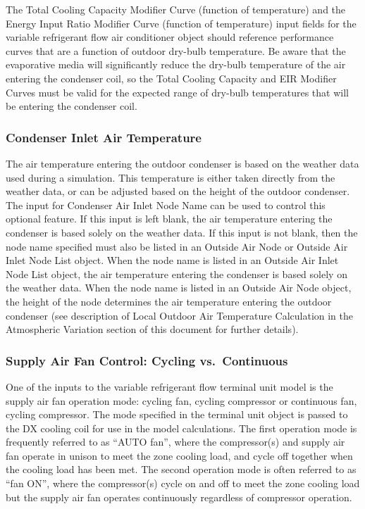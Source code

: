 The Total Cooling Capacity Modifier Curve (function of temperature) and the Energy Input Ratio Modifier Curve (function of temperature) input fields for the variable refrigerant flow air conditioner object should reference performance curves that are a function of outdoor dry-bulb temperature. Be aware that the evaporative media will significantly reduce the dry-bulb temperature of the air entering the condenser coil, so the Total Cooling Capacity and EIR Modifier Curves must be valid for the expected range of dry-bulb temperatures that will be entering the condenser coil.

\subsubsection{Condenser Inlet Air Temperature}\label{condenser-inlet-air-temperature-2}

The air temperature entering the outdoor condenser is based on the weather data used during a simulation. This temperature is either taken directly from the weather data, or can be adjusted based on the height of the outdoor condenser. The input for Condenser Air Inlet Node Name can be used to control this optional feature. If this input is left blank, the air temperature entering the condenser is based solely on the weather data. If this input is not blank, then the node name specified must also be listed in an Outside Air Node or Outside Air Inlet Node List object. When the node name is listed in an Outside Air Inlet Node List object, the air temperature entering the condenser is based solely on the weather data. When the node name is listed in an Outside Air Node object, the height of the node determines the air temperature entering the outdoor condenser (see description of Local Outdoor Air Temperature Calculation in the Atmospheric Variation section of this document for further details).

\subsubsection{Supply Air Fan Control: Cycling vs.~Continuous}\label{supply-air-fan-control-cycling-vs.continuous-2}

One of the inputs to the variable refrigerant flow terminal unit model is the supply air fan operation mode: cycling fan, cycling compressor or continuous fan, cycling compressor. The mode specified in the terminal unit object is passed to the DX cooling coil for use in the model calculations. The first operation mode is frequently referred to as ``AUTO fan'', where the compressor(s) and supply air fan operate in unison to meet the zone cooling load, and cycle off together when the cooling load has been met. The second operation mode is often referred to as ``fan ON'', where the compressor(s) cycle on and off to meet the zone cooling load but the supply air fan operates continuously regardless of compressor operation.

